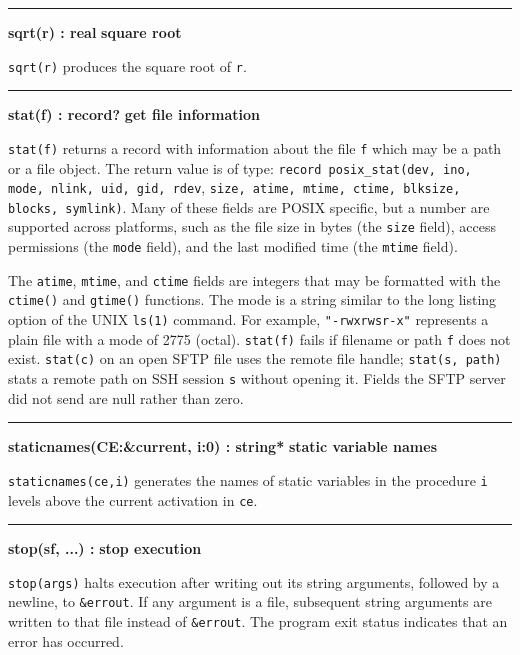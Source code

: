 \bigskip\hrule\vspace{0.1cm}
\noindent
{\bf sqrt(r) : real } \hfill {\bf square root}

\noindent
{}\texttt{sqrt(r)} produces the square root of
\texttt{r}.

\bigskip\hrule\vspace{0.1cm}
\noindent
{\bf stat(f) : record? } \hfill {\bf get file information}

\noindent
{}\texttt{stat(f)} returns a record
with information about the file \texttt{f} which may be a path or a
file object. The return value is of type:
\texttt{record posix\_stat(dev, ino, mode, nlink, uid, gid, rdev},
\texttt{size, atime, mtime, ctime, blksize, blocks, symlink)}.
Many of these fields are POSIX
specific, but a number are supported across platforms, such as the
file size in bytes (the \texttt{size} field), access
permissions (the \texttt{mode} field), and the last modified time (the
\texttt{mtime} field).

The \texttt{atime}, \texttt{mtime}, and \texttt{ctime} fields are
integers that may be formatted with the \texttt{ctime()} and
\texttt{gtime()} functions. The mode is a string similar to the long
listing option of the UNIX \texttt{ls(1)} command. For example,
\texttt{"-rwxrwsr-x"} represents a plain
file with a mode of 2775 (octal). \texttt{stat(f)} fails if filename or
path \texttt{f} does not exist. \texttt{stat(c)} on an open SFTP file
uses the remote file handle; \texttt{stat(s, path)} stats a remote path
on SSH session \texttt{s} without opening it. Fields the SFTP server
did not send are null rather than zero.

\bigskip\hrule\vspace{0.1cm}
\noindent
{\bf staticnames(CE:\&current, i:0) : string* } \hfill {\bf static variable names}

\noindent
{}\texttt{staticnames(ce,i)} generates the names of static
variables in the procedure \texttt{i} levels above the current
activation in \texttt{ce}.

\bigskip\hrule\vspace{0.1cm}
\noindent
{\bf stop(s{\textbar}f, ...) : } \hfill {\bf stop execution}

\noindent
{}\texttt{stop(args)} halts execution after
writing out its string arguments, followed by a newline, to
\texttt{\&errout}. If any argument is a file, subsequent string
arguments are written to that file instead of \texttt{\&errout}. The
program exit status indicates that an error has occurred.

